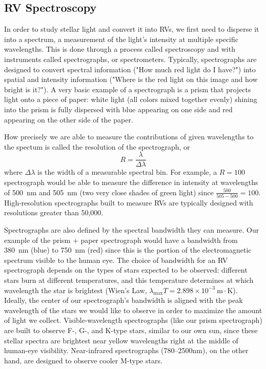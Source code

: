 \subsection{RV Spectroscopy}

In order to study stellar light and convert it into RVs, we first need to disperse it into a spectrum, a measurement of the light's intensity at multiple specific wavelengths. This is done through a process called spectroscopy and with instruments called spectrographs, or spectrometers. Typically, spectrographs are designed to convert spectral information ("How much red light do I have?") into spatial and intensity information ("Where is the red light on this image and how bright is it?"). A very basic example of a spectrograph is a prism that projects light onto a piece of paper: white light (all colors mixed together evenly) shining into the prism is fully dispersed with blue appearing on one side and red appearing on the other side of the paper.

How precisely we are able to measure the contributions of given wavelengths to the spectum is called the resolution of the spectrograph, or
\begin{equation}
    R = \frac{\lambda}{\Delta \lambda}
\end{equation}
where $\Delta \lambda$ is the width of a measurable spectral bin. For example, a $R=100$ spectrograph would be able to measure the difference in intensity at wavelengths of 500~nm and 505~nm (two very close shades of green light) since $\frac{500}{505-500} = 100$. High-resolution spectrographs built to measure RVs are typically designed with resolutions greater than 50,000.

Spectrographs are also defined by the spectral bandwidth they can measure. Our example of the prism + paper spectrograph would have a bandwidth from 380~nm (blue) to 750~nm (red) since this is the portion of the electromagnetic spectrum visible to the human eye. The choice of bandwidth for an RV spectrograph depends on the types of stars expected to be observed: different stars burn at different temperatures, and this temperature determines at which wavelength the star is brightest (Wien's Law, $\lambda_{\mathrm{max}}T = 2.898\times10^{-3}~\mathrm{m\cdot K}$). Ideally, the center of our spectrograph's bandwidth is aligned with the peak wavelength of the stars we would like to observe in order to maximize the amount of light we collect. Visible-wavelength spectrographs (like our prism spectrograph) are built to observe F-, G-, and K-type stars, similar to our own sun, since these stellar spectra are brightest near yellow wavelengths right at the middle of human-eye visibility. Near-infrared spectrographs (780--2500nm), on the other hand, are designed to observe cooler M-type stars.

